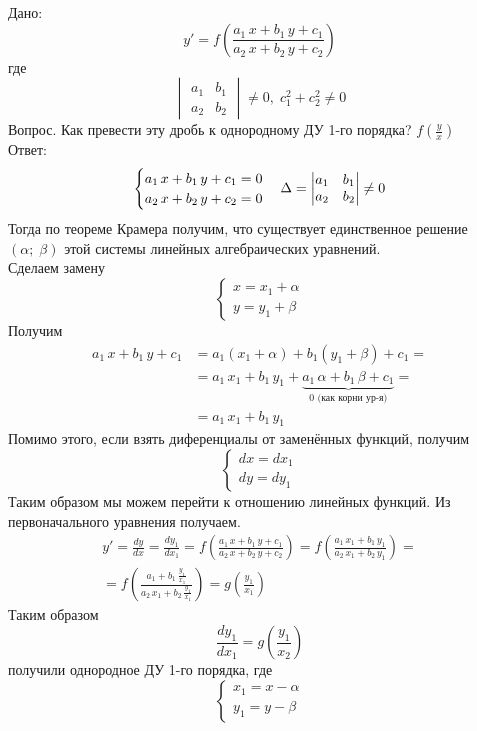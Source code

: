\begin{Note}
    Дано:
    \[
        y' = f\left(\frac{a_1\,x + b_1\,y + c_1}{a_2\,x + b_2\,y + c_2}\right)
    \]
    где 
    \[
        \begin{vmatrix} a_1 & b_1 \\ a_2 & b_2\end{vmatrix} \neq 0, \; c_1^2 + c_2^2 \neq 0
    \]
    Вопрос. Как превести эту дробь к однородному ДУ 1-го порядка? $f\left(\frac{y}{x}\right)$\\
    Ответ:
    \[
        \begin{cases}
            a_1\,x + b_1\,y + c_1 = 0\\
            a_2\,x + b_2\,y + c_2 = 0
        \end{cases} \Delta = \begin{vmatrix} a_1 & b_1 \\ a_2 & b_2\end{vmatrix} \neq 0\\
    \]
    Тогда по теореме Крамера получим, что существует единственное решение $(\alpha;\; \beta)$ этой системы линейных алгебраических уравнений.\\
    Сделаем замену
    \[
    \begin{cases}
        x = x_1 + \alpha\\
        y = y_1 + \beta
    \end{cases}
    \]
    Получим
    \begin{align*}
        a_1\,x + b_1\,y + c_1 &= a_1(x_1 + \alpha) + b_1(y_1 + \beta) + c_1 = \\
        &=a_1\,x_1 + b_1\,y_1 + \underbrace{a_1\,\alpha + b_1\,\beta + c_1}_{0 \text{ (как корни ур-я)}} = \\
        &=a_1\,x_1 + b_1\,y_1
    \end{align*}
    Помимо этого, если взять диференциалы от заменённых функций, получим
    \[
        \begin{cases}
            dx = dx_1\\
            dy = dy_1
        \end{cases}
    \]
    Таким образом мы можем перейти к отношению линейных функций. Из первоначального уравнения получаем.
    \begin{multline*}
        y' = \frac{dy}{dx} = \frac{dy_1}{dx_1} = f\left(\frac{a_1\,x + b_1\,y + c_1}{a_2\,x +  b_2\,y + c_2}\right) = f\left(\frac{a_1\,x_1 +  b_1\,y_1}{a_2\,x_1 + b_2\,y_1}\right) =\\
        = f\left(\frac{a_1 +  b_1\,\frac{y_1}{x_1}}{a_2\,x_1 + b_2\,\frac{y_1}{x_1}}\right) = g\left(\frac{y_1}{x_1}\right)
    \end{multline*}
    Таким образом
    \[
        \frac{dy_1}{dx_1} = g\left(\frac{y_1}{x_2}\right)
    \]
    получили однородное ДУ 1-го порядка, где 
    \[
        \begin{cases}
            x_1 = x - \alpha\\
            y_1 = y - \beta
        \end{cases}
    \]
\end{Note}


